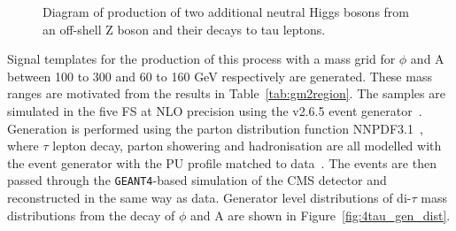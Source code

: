 \begin{figure}[H]
\centering
{}
\vspace*{10mm}
\caption{Diagram of production of two additional neutral Higgs bosons from an off-shell Z boson and their decays to tau leptons.}
\label{fig:4tau_feynamn}
\end{figure}

Signal templates for the production of this process with a mass grid for $\phi$ and A between 100 to 300 and 60 to 160 GeV respectively are generated.
These mass ranges are motivated from the results in Table~\ref{tab:gm2region}.
The samples are simulated in the five \ac{FS} at \ac{NLO} precision using the \MGvATNLO v2.6.5 event generator~\cite{Alwall:2011uj}.
Generation is performed using the parton distribution function NNPDF3.1~\cite{Ball:2014uwa,Ball:2017nwa}, where $\tau$ lepton decay, parton showering and hadronisation are all modelled with the \PYTHIA event generator with the PU profile matched to data~\cite{Sirunyan:2019dfx,Sjostrand:2014zea}.
The events are then passed through the \texttt{GEANT4}-based \cite{Agostinelli:2002hh} simulation of the CMS detector and reconstructed in the same way as data.
Generator level distributions of di-$\tau$ mass distributions from the decay of $\phi$ and A are shown in Figure~\ref{fig:4tau_gen_dist}.\\

